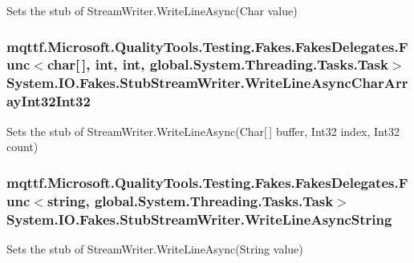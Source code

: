 Sets the stub of Stream\-Writer.\-Write\-Line\-Async(\-Char value)

\hypertarget{class_system_1_1_i_o_1_1_fakes_1_1_stub_stream_writer_a54aa1eb981e617303b2c23dc9e2903e6}{
\subsubsection[{Write\-Line\-Async\-Char\-Array\-Int32\-Int32}]{\setlength{\rightskip}{0pt plus 5cm}mqttf.\-Microsoft.\-Quality\-Tools.\-Testing.\-Fakes.\-Fakes\-Delegates.\-Func$<$char\mbox{[}$\,$\mbox{]}, int, int, global.\-System.\-Threading.\-Tasks.\-Task$>$ System.\-I\-O.\-Fakes.\-Stub\-Stream\-Writer.\-Write\-Line\-Async\-Char\-Array\-Int32\-Int32}}\label{class_system_1_1_i_o_1_1_fakes_1_1_stub_stream_writer_a54aa1eb981e617303b2c23dc9e2903e6}


Sets the stub of Stream\-Writer.\-Write\-Line\-Async(\-Char\mbox{[}$\,$\mbox{]} buffer, Int32 index, Int32 count)

\hypertarget{class_system_1_1_i_o_1_1_fakes_1_1_stub_stream_writer_a28c797e98a6d6888d8c5ea1bfafd284b}{
\subsubsection[{Write\-Line\-Async\-String}]{\setlength{\rightskip}{0pt plus 5cm}mqttf.\-Microsoft.\-Quality\-Tools.\-Testing.\-Fakes.\-Fakes\-Delegates.\-Func$<$string, global.\-System.\-Threading.\-Tasks.\-Task$>$ System.\-I\-O.\-Fakes.\-Stub\-Stream\-Writer.\-Write\-Line\-Async\-String}}\label{class_system_1_1_i_o_1_1_fakes_1_1_stub_stream_writer_a28c797e98a6d6888d8c5ea1bfafd284b}


Sets the stub of Stream\-Writer.\-Write\-Line\-Async(\-String value)

